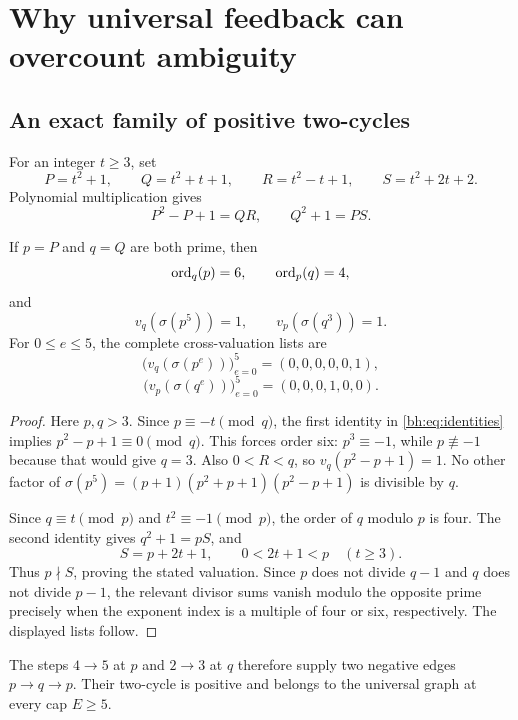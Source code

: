 \chapter{Why universal feedback can overcount ambiguity}\label{ch:bh}
\section{An exact family of positive two-cycles}
For an integer $t\ge3$, set
\[
 P=t^2+1,\qquad Q=t^2+t+1,\qquad R=t^2-t+1,\qquad S=t^2+2t+2.
\]
Polynomial multiplication gives
\begin{equation}\label{bh:eq:identities}
 \boxed{P^2-P+1=QR,\qquad Q^2+1=PS.}
\end{equation}

\begin{lemma}\label{bh:lem:orders}
If $p=P$ and $q=Q$ are both prime, then
\[
 \operatorname{ord}_q(p)=6,\qquad \operatorname{ord}_p(q)=4,
\]
and
\[
 v_q(\sigma(p^5))=1,\qquad v_p(\sigma(q^3))=1.
\]
For $0\le e\le5$, the complete cross-valuation lists are
\[
 \bigl(v_q(\sigma(p^e))\bigr)_{e=0}^{5}=(0,0,0,0,0,1),
\]
\[
 \bigl(v_p(\sigma(q^e))\bigr)_{e=0}^{5}=(0,0,0,1,0,0).
\]
\end{lemma}
\begin{proof}
Here $p,q>3$. Since $p\equiv-t\pmod q$, the first identity in \eqref{bh:eq:identities} implies $p^2-p+1\equiv0\pmod q$. This forces order six: $p^3\equiv-1$, while $p\not\equiv-1$ because that would give $q=3$. Also $0<R<q$, so $v_q(p^2-p+1)=1$. No other factor of $\sigma(p^5)=(p+1)(p^2+p+1)(p^2-p+1)$ is divisible by $q$.

Since $q\equiv t\pmod p$ and $t^2\equiv-1\pmod p$, the order of $q$ modulo $p$ is four. The second identity gives $q^2+1=pS$, and
\[
 S=p+2t+1,\qquad 0<2t+1<p\quad(t\ge3).
\]
Thus $p\nmid S$, proving the stated valuation. Since $p$ does not divide $q-1$ and $q$ does not divide $p-1$, the relevant divisor sums vanish modulo the opposite prime precisely when the exponent index is a multiple of four or six, respectively. The displayed lists follow.
\end{proof}

The steps $4\to5$ at $p$ and $2\to3$ at $q$ therefore supply two negative edges $p\to q\to p$. Their two-cycle is positive and belongs to the universal graph at every cap $E\ge5$.

